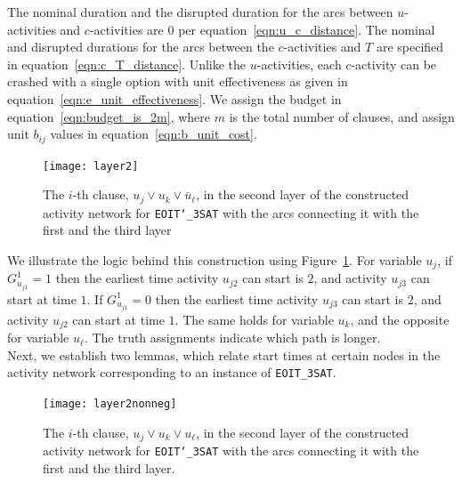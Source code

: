 \documentclass[11pt]{article}
\newcommand{\noi}{\noindent}
\newcommand{\tcr}{\textcolor{red}}
\newcommand{\tcb}{\textcolor{blue}}
\begin{document}
	The nominal duration and the disrupted duration for the arcs between \(u\)-activities and \(c\)-activities are \(0\) per equation~\eqref{eqn:u_c_distance}. The nominal and disrupted durations for the arcs between the \(c\)-activities and \(T\) are specified in equation~\eqref{eqn:c_T_distance}. Unlike the \(u\)-activities, each \(c\)-activity can be crashed with a single option with unit effectiveness as given in equation~\eqref{eqn:e_unit_effectiveness}. We assign the budget in equation~\eqref{eqn:budget_is_2m}, where \(m\) is the total number of clauses, and assign unit $b_{ij}$ values in equation~\eqref{eqn:b_unit_cost}.
	\begin{figure}
		\centering
		\texttt{[image: layer2]}
		\caption{The \(i\)-th clause, \(u_{j} \vee u_{k} \vee \bar{u}_{\ell}\), in the second layer of the constructed activity network for \texttt{EOIT\char`_3SAT} with the arcs connecting it with the first and the third layer}
		\label{fig:layer2}
	\end{figure}
	\noi We illustrate the logic behind this construction using Figure~\ref{fig:layer2}. For variable \(u_j\), if \(G^1_{u_{j1}} = 1\) then the earliest time activity \(u_{j2}\) can start is \(2\), and activity \(u_{j3}\) can start at time \(1\). If \(G^1_{u_{j1}} = 0\) then the earliest time activity \(u_{j3}\) can start is \(2\), and activity \(u_{j2}\) can start at time \(1\). The same holds for variable \(u_k\), and the opposite for variable \(u_\ell\). The truth assignments indicate which path is longer.
	\\
	\newline
	Next, we establish two lemmas, which relate start times at certain nodes in the activity network corresponding to an instance of \verb|EOIT_3SAT|.
	\begin{figure}
		\centering
		\texttt{[image: layer2nonneg]}
		\caption{The \(i\)-th clause, \(u_{j} \vee u_{k} \vee u_{\ell}\), in the second layer of the constructed activity network for \texttt{EOIT\char`_3SAT} with the arcs connecting it with the first and the third layer.}
		\label{fig:layer2nonneg}
	\end{figure}
\end{document}
